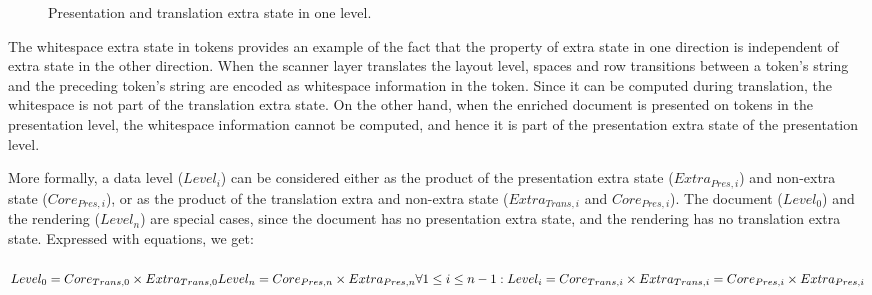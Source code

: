 \begin{figure}
\begin{center}
\begin{center}
\end{center}
\caption{Presentation and translation extra state in one level.}\label{levelExtraState} 
\end{center}
\end{figure}

The whitespace extra state in tokens provides an example of the fact that the property of extra state in one direction is independent of extra state in the other direction. When the scanner layer translates the layout level, spaces and row transitions between a token's string and the preceding token's string are encoded as whitespace information in the token. Since it can be computed during translation, the whitespace is not part of the translation extra state. On the other hand, when the enriched document is presented on tokens in the presentation level, the whitespace information cannot be computed, and hence it is part of the presentation extra state of the presentation level.
 


More formally, a data level ($Level_{i}$) can be considered either as the product of the presentation extra state ($Extra_{Pres,i}$) and non-extra state ($Core_{Pres,i}$), or as the product of the translation extra and non-extra state ($Extra_{Trans,i}$ and $Core_{Pres,i}$). The document ($Level_0$) and the rendering ($Level_n$) are special cases, since the document has no presentation extra state, and the rendering has no translation extra state. Expressed with equations, we get:

\begin{small}\begin{align*}%
\end{align*} 
\begin{math}
Level_{0} = Core_{Trans,0} \times Extra_{Trans,0}
Level_{n} = Core_{Pres,n} \times Extra_{Pres,n}
\forall 1 \le i \le n-1:  \\
Level_{i} = Core_{Trans,i} \times Extra_{Trans,i} = Core_{Pres,i} \times Extra_{Pres,i} 
\end{math}\end{small}


